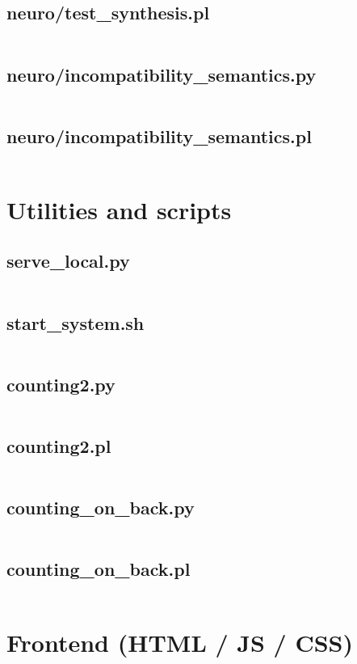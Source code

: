 \documentclass{article}
\begin{document}
\subsection{neuro/test\_synthesis.pl}
\inputminted{prolog}{neuro/test_synthesis.pl}
\subsection{neuro/incompatibility\_semantics.py}
\inputminted{python}{neuro/incompatibility_semantics.py}
\subsection{neuro/incompatibility\_semantics.pl}
\inputminted{prolodg}{neuro/incompatibility_semantics.pl}

\section{Utilities and scripts}
\subsection{serve\_local.py}
\inputminted{python}{serve_local.py}
\subsection{start\_system.sh}
\inputminted{bash}{start_system.sh}
\subsection{counting2.py}
\inputminted{python}{counting2.py}
\subsection{counting2.pl}
\inputminted{prolog}{counting2.pl}
\subsection{counting\_on\_back.py}
\inputminted{python}{counting_on_back.py}
\subsection{counting\_on\_back.pl}
\inputminted{prolog}{counting_on_back.pl}

\section{Frontend (HTML / JS / CSS)}
\end{document}
